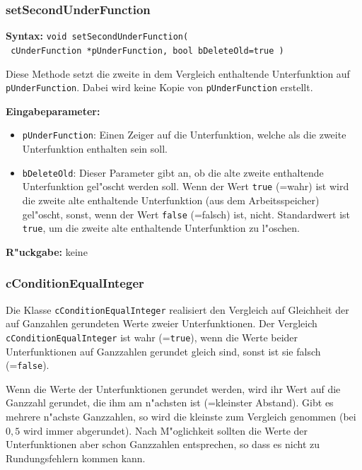 \subsubsection{setSecondUnderFunction}

\textbf{Syntax:} \verb|void setSecondUnderFunction(| \\\verb| cUnderFunction *pUnderFunction, bool bDeleteOld=true )|

\bigskip\noindent
Diese Methode setzt die zweite in dem Vergleich enthaltende Unterfunktion auf \verb|pUnderFunction|. Dabei wird keine Kopie von \verb|pUnderFunction| erstellt.

\bigskip\noindent
\textbf{Eingabeparameter:}
\begin{itemize}
 \item \verb|pUnderFunction|: Einen Zeiger auf die Unterfunktion, welche als die zweite Unterfunktion enthalten sein soll.
 \item \verb|bDeleteOld|: Dieser Parameter gibt an, ob die alte zweite enthaltende Unterfunktion gel"oscht werden soll. Wenn der Wert \verb|true| (=wahr) ist wird die zweite alte enthaltende Unterfunktion (aus dem Arbeitsspeicher) gel"oscht, sonst, wenn der Wert \verb|false| (=falsch) ist, nicht. Standardwert ist \verb|true|, um die zweite alte enthaltende Unterfunktion zu l"oschen.
\end{itemize}

\bigskip\noindent
\textbf{R"uckgabe:} keine


\subsubsection{cConditionEqualInteger}

Die Klasse \verb|cConditionEqualInteger| realisiert den Vergleich auf Gleichheit der auf Ganzahlen gerundeten Werte zweier Unterfunktionen. Der Vergleich \verb|cConditionEqualInteger| ist wahr (=\verb|true|), wenn die Werte beider Unterfunktionen auf Ganzzahlen gerundet gleich sind, sonst ist sie falsch  (=\verb|false|).

Wenn die Werte der Unterfunktionen gerundet werden, wird ihr Wert auf die Ganzzahl gerundet, die ihm am n"achsten ist (=kleinster Abstand). Gibt es mehrere n"achste Ganzzahlen, so wird die kleinste zum Vergleich genommen (bei $0,5$ wird immer abgerundet). Nach M"oglichkeit sollten die Werte der Unterfunktionen aber schon Ganzzahlen entsprechen, so dass es nicht zu Rundungsfehlern kommen kann.


